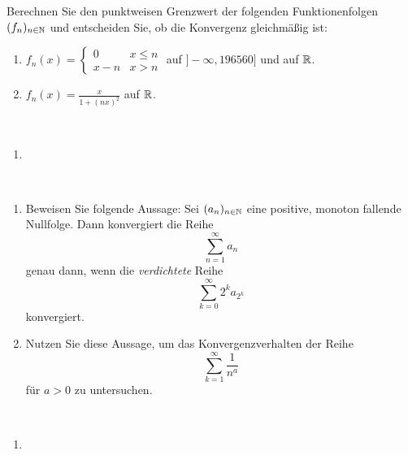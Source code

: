\begin{aufg}[6 Punkte]
Berechnen Sie den punktweisen Grenzwert der folgenden Funktionenfolgen~$(f_n)_{n\in\mathbb{N}}$ und entscheiden Sie, ob die Konvergenz gleichm\"a{\ss}ig ist:
\begin{enumerate}[label=$\mathrm{(\roman*)}$, ref=$\mathrm{\roman*}$]
\item $f_n(x) = \begin{cases} 0 & x \leq n \\ x-n & x > n \end{cases}$ auf
${}]-\infty, 196560]$ und auf $\mathbb{R}$.
\item $f_n(x) = \frac{x}{1+(nx)^2}$ auf $\mathbb{R}$.
\end{enumerate}
\end{aufg}
 
\bigskip

\begin{lsg}\mbox{ }
\begin{enumerate}[label=$\mathrm{(\roman*)}$, ref=$\mathrm{\roman*}$]
\item 
\end{enumerate}
\end{lsg}

\bigskip

\begin{aufg}[6 Punkte]\mbox{ }
\begin{enumerate}[label=$\mathrm{(\roman*)}$, ref=$\mathrm{\roman*}$]
\item Beweisen Sie folgende Aussage: Sei $(a_n)_{n\in\mathbb{N}}$ eine positive, monoton fallende Nullfolge. Dann konvergiert die Reihe 
\[
\sum_{n=1}^{\infty}a_n
\]
genau dann, wenn die \emph{verdichtete} Reihe 
\[
\sum_{k=0}^{\infty}2^k a_{2^k}
\]
konvergiert. 
\item Nutzen Sie diese Aussage, um das Konvergenzverhalten der Reihe 
\[
\sum_{k=1}^{\infty}\frac{1}{n^a}
\]
f\"ur $a>0$ zu untersuchen. 
\end{enumerate}
\end{aufg}

\bigskip

\begin{lsg}\mbox{ }
\begin{enumerate}[label=$\mathrm{(\roman*)}$, ref=$\mathrm{\roman*}$]
\item 
\end{enumerate}
\end{lsg}

\bigskip


